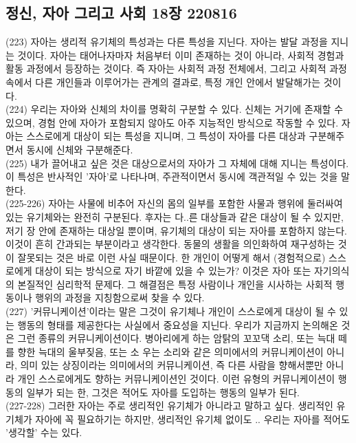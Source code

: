 \documentclass[11pt, a4paper]{article}
\begin{document}
\subsection{정신, 자아 그리고 사회 18장 220816}
(223) 자아는 생리적 유기체의 특성과는 다른 특성을 지닌다. 자아는 발달 과정을 지니는 것이다. 자아는 태어나자마자 처음부터 이미 존재하는 것이 아니라, 사회적 경험과 활동 과정에서 등장하는 것이다. 즉 자아는 사회적 과정 전체에서, 그리고 사회적 과정 속에서 다른 개인들과 이루어가는 관계의 결과로, 특정 개인 안에서 발달해가는 것이다. \\
(224) 우리는 자아와 신체의 차이를 명확히 구분할 수 있다. 신체는 거기에 존재할 수 있으며, 경험 안에 자아가 포함되지 않아도 아주 지능적인 방식으로 작동할 수 있다. 자아는 스스로에게 대상이 되는 특성을 지니며, 그 특성이 자아를 다른 대상과 구분해주면서 동시에 신체와 구분해준다. \\
(225) 내가 끌어내고 싶은 것은 대상으로서의 자아가 그 자체에 대해 지니는 특성이다. 이 특성은 반사적인 '자아'로 나타나며, 주관적이면서 동시에 객관적일 수 있는 것을 말한다. \\
(225-226) 자아는 사물에 비추어 자신의 몸의 일부를 포함한 사물과 행위에 둘러싸여 있는 유기체와는 완전히 구분된다. 후자는 다..른 대상들과 같은 대상이 될 수 있지만, 저기 장 안에 존재하는 대상일 뿐이며, 유기체의 대상이 되는 자아를 포함하지 않는다. 이것이 흔히 간과되는 부분이라고 생각한다. 동물의 생활을 의인화하여 재구성하는 것이 잘못되는 것은 바로 이런 사실 때문이다. 한 개인이 어떻게 해서 (경험적으로) 스스로에게 대상이 되는 방식으로 자기 바깥에 있을 수 있는가? 이것은 자아 또는 자기의식의 본질적인 심리학적 문제다. 그 해결점은 특정 사람이나 개인을 시사하는 사회적 행동이나 행위의 과정을 지칭함으로써 찾을 수 있다. \\
(227) '커뮤니케이션'이라는 말은 그것이 유기체나 개인이 스스로에게 대상이 될 수 있는 행동의 형태를 제공한다는 사실에서 중요성을 지닌다. 우리가 지금까지 논의해온 것은 그런 종류의 커뮤니케이션이다. 병아리에게 하는 암탉의 꼬꼬댁 소리, 또는 늑대 떼를 향한 늑대의 울부짖음, 또는 소 우는 소리와 같은 의미에서의 커뮤니케이션이 아니라, 의미 있는 상징이라는 의미에서의 커뮤니케이션, 즉 다른 사람을 향해서뿐만 아니라 개인 스스로에게도 향하는 커뮤니케이션인 것이다. 이런 유형의 커뮤니케이션이 행동의 일부가 되는 한, 그것은 적어도 자아를 도입하는 행동의 일부가 된다. \\
(227-228) 그러한 자아는 주로 생리적인 유기체가 아니라고 말하고 싶다. 생리적인 유기체가 자아에 꼭 필요하기는 하지만, 생리적인 유기체 없이도 .. 우리는 자아를 적어도 '생각할' 수는 있다.\\
\end{document}
